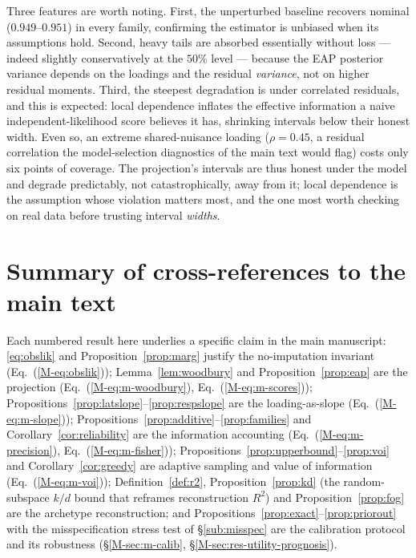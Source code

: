 \documentclass[11pt]{article}
\theoremstyle{plain}
\theoremstyle{definition}
\newcommand{\MEq}[1]{Eq.~(\ref{M-#1})}
\newcommand{\MSec}[1]{\S\ref{M-#1}}
\begin{document}
Three features are worth noting. First, the unperturbed baseline recovers nominal ($0.949$--$0.951$)
in every family, confirming the estimator is unbiased when its assumptions hold. Second, heavy
tails are absorbed essentially without loss --- indeed slightly conservatively at the $50\%$
level --- because the EAP posterior variance depends on the loadings and the residual
\emph{variance}, not on higher residual moments. Third, the steepest degradation is under
correlated residuals, and this is expected: local dependence inflates the effective information a
naive independent-likelihood score believes it has, shrinking intervals below their honest width.
Even so, an extreme shared-nuisance loading ($\rho=0.45$, a residual correlation the
model-selection diagnostics of the main text would flag) costs only six points of coverage. The
projection's intervals are thus honest under the model and degrade predictably, not
catastrophically, away from it; local dependence is the assumption whose violation matters most,
and the one most worth checking on real data before trusting interval \emph{widths}.

\section*{Summary of cross-references to the main text}

Each numbered result here underlies a specific claim in the main manuscript:
\eqref{eq:obslik} and Proposition~\ref{prop:marg} justify the no-imputation invariant
(\MEq{eq:obslik}); Lemma~\ref{lem:woodbury} and Proposition~\ref{prop:eap} are the projection
(\MEq{eq:m-woodbury}, \MEq{eq:m-scores}); Propositions~\ref{prop:latslope}--\ref{prop:respslope}
are the loading-as-slope (\MEq{eq:m-slope}); Propositions~\ref{prop:additive}--\ref{prop:families}
and Corollary~\ref{cor:reliability} are the information accounting (\MEq{eq:m-precision},
\MEq{eq:m-fisher}); Propositions~\ref{prop:upperbound}--\ref{prop:voi} and
Corollary~\ref{cor:greedy} are adaptive sampling and value of information (\MEq{eq:m-voi});
Definition~\ref{def:r2}, Proposition~\ref{prop:kd} (the random-subspace $k/d$ bound that reframes
reconstruction $R^2$) and Proposition~\ref{prop:fog} are the archetype reconstruction; and
Propositions~\ref{prop:exact}--\ref{prop:priorout} with the misspecification stress test of
\S\ref{sub:misspec} are the calibration protocol and its robustness (\MSec{sec:m-calib},
\MSec{sec:res-utility-prognosis}).



\end{document}
